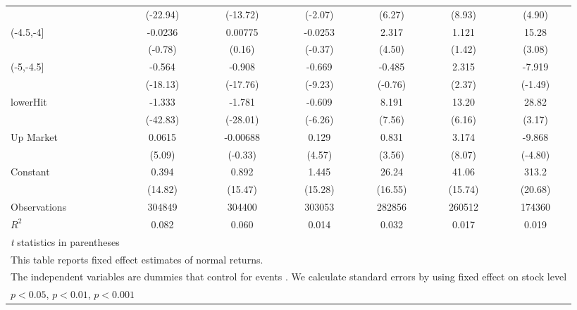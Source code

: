 {\begin{tabular}{l*{6}{c}}
                    &    (-22.94)         &    (-13.72)         &     (-2.07)         &      (6.27)         &      (8.93)         &      (4.90)         \\
[1em]
(-4.5,-4]           &     -0.0236         &     0.00775         &     -0.0253         &       2.317\sym{***}&       1.121         &       15.28\sym{**} \\
                    &     (-0.78)         &      (0.16)         &     (-0.37)         &      (4.50)         &      (1.42)         &      (3.08)         \\
[1em]
(-5,-4.5]           &      -0.564\sym{***}&      -0.908\sym{***}&      -0.669\sym{***}&      -0.485         &       2.315\sym{*}  &      -7.919         \\
                    &    (-18.13)         &    (-17.76)         &     (-9.23)         &     (-0.76)         &      (2.37)         &     (-1.49)         \\
[1em]
lowerHit            &      -1.333\sym{***}&      -1.781\sym{***}&      -0.609\sym{***}&       8.191\sym{***}&       13.20\sym{***}&       28.82\sym{**} \\
                    &    (-42.83)         &    (-28.01)         &     (-6.26)         &      (7.56)         &      (6.16)         &      (3.17)         \\
[1em]
Up Market           &      0.0615\sym{***}&    -0.00688         &       0.129\sym{***}&       0.831\sym{***}&       3.174\sym{***}&      -9.868\sym{***}\\
                    &      (5.09)         &     (-0.33)         &      (4.57)         &      (3.56)         &      (8.07)         &     (-4.80)         \\
[1em]
Constant            &       0.394\sym{***}&       0.892\sym{***}&       1.445\sym{***}&       26.24\sym{***}&       41.06\sym{***}&       313.2\sym{***}\\
                    &     (14.82)         &     (15.47)         &     (15.28)         &     (16.55)         &     (15.74)         &     (20.68)         \\
\hline
Observations        &      304849         &      304400         &      303053         &      282856         &      260512         &      174360         \\
\(R^{2}\)           &       0.082         &       0.060         &       0.014         &       0.032         &       0.017         &       0.019         \\
\hline\hline
\multicolumn{7}{l}{\footnotesize \textit{t} statistics in parentheses}\\
\multicolumn{7}{l}{\footnotesize This table reports fixed effect estimates of normal returns.}\\
\multicolumn{7}{l}{\footnotesize The independent variables are dummies that control for events . We calculate standard errors by using fixed effect on stock level}\\
\multicolumn{7}{l}{\footnotesize \sym{*} \(p<0.05\), \sym{**} \(p<0.01\), \sym{***} \(p<0.001\)}\\
\end{tabular}
}

